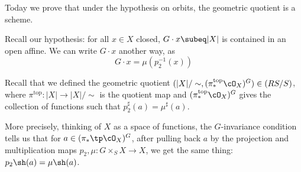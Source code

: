 

Today we prove that under the hypothesis on orbits, the geometric quotient is a scheme.

Recall our hypothesis: for all $x\in X$ closed, $G\cdot x\subeq |X|$ is contained in an open affine. We can write $G\cdot x$ another way, as
\[
G\cdot x=\mu(p_2^{-1}(x))
\]

Recall that we defined the geometric quotient $(|X|/\sim,(\pi_*^{\text{top}}\cO_X)^G)\in (RS/S)$, where $\pi^{\text{top}}:|X|\to |X|/\sim$ is the quotient map and  $(\pi_*^{\text{top}}\cO_X)^G$ gives the collection of functions such that $p_2^{\sharp}(a)=\mu^{\sharp}(a)$.

More precisely, thinking of $X$ as a space of functions, the $G$-invariance condition tells us that for $a\in (\pi_*\tp\cO_X)^G$, after pulling back $a$ by the projection and multiplication maps $p_2,\mu:G\times_S X\to X$, we get the same thing: $p_2\sh(a)=\mu\sh(a)$.
